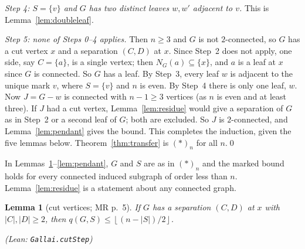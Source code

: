 \documentclass[11pt]{amsart}
\newtheorem{lemma}[theorem]{Lemma}
\theoremstyle{definition}
\theoremstyle{remark}
\renewcommand{\_}{\oldunderscore\allowbreak}
\newcommand{\leanst}[1]{\par{\raggedright\small\textup{(Lean: \texttt{#1})}\par}}
\newcommand{\fl}[1]{\left\lfloor #1\right\rfloor}
\begin{document}
\emph{Step 4: $S=\{v\}$ and $G$ has two distinct leaves $w,w'$ adjacent to $v$.} This is
Lemma~\ref{lem:doubleleaf}.

\emph{Step 5: none of Steps 0--4 applies.} Then $n\ge3$ and $G$ is not $2$-connected, so $G$ has a
cut vertex $x$ and a separation $(C,D)$ at $x$. Since Step~2 does not apply, one side, say $C=\{a\}$,
is a single vertex; then $N_G(a)\subseteq\{x\}$, and $a$ is a leaf at $x$ since $G$ is connected. So
$G$ has a leaf. By Step~3, every leaf $w$ is adjacent to the unique mark $v$, where $S=\{v\}$ and $n$
is even. By Step~4 there is only one leaf, $w$. Now $J=G-w$ is connected with $n-1\ge3$ vertices
(as $n$ is even and at least three). If $J$ had a cut vertex, Lemma~\ref{lem:residue} would give a
separation of $G$ as in Step~2 or a second leaf of $G$; both are excluded. So $J$ is $2$-connected,
and Lemma~\ref{lem:pendant} gives the bound. This completes the induction, given the five lemmas
below. Theorem~\ref{thm:transfer} is $(\ast)_n$ for all $n$.\qed

\medskip
In Lemmas~\ref{lem:cut}--\ref{lem:pendant}, $G$ and $S$ are as in $(\ast)_n$ and the marked bound
holds for every connected induced subgraph of order less than $n$. Lemma~\ref{lem:residue} is a
statement about any connected graph.

\begin{lemma}[cut vertices; MR p.~5]\label{lem:cut}
If $G$ has a separation $(C,D)$ at $x$ with $|C|,|D|\ge2$, then $q(G,S)\le\fl{(n-|S|)/2}$.
\leanst{Gallai.cutStep}
\end{lemma}
\end{document}
